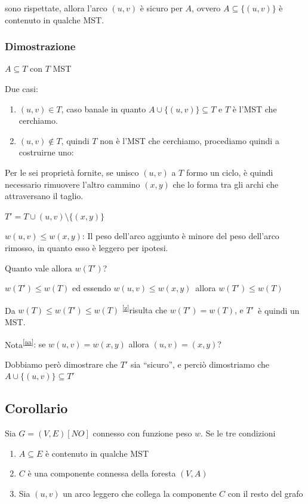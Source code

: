 \documentclass[tikz]{article}
\providecommand{\tightlist}{%
  \setlength{\itemsep}{0pt}\setlength{\parskip}{0pt}}
\begin{document}
{{{sono rispettate, allora l'arco $(u,v)$ è sicuro per $A$, ovvero $A \subseteq \{(u,v)\}$ è contenuto in qualche MST.}

\subsubsection{Dimostrazione}

{$A \subseteq T$ con $T$ MST}

{Due casi:}

\begin{enumerate}
\tightlist
\item
  {$(u,v) \in T$, caso banale in quanto $A \cup \{(u,v)\} \subseteq T$  e $T$ è l'MST che cerchiamo.}
\item
  {$(u,v) \notin T$, quindi $T$ non è l'MST che cerchiamo, procediamo quindi a costruirne uno:}
\end{enumerate}

{Per le sei proprietà fornite, se unisco $(u,v)$ a $T$ formo un ciclo, è quindi necessario rimuovere l'altro cammino $(x,y)$ che lo forma tra gli archi che attraversano il taglio. }

$T' = T \cup {(u,v)} \setminus \{(x,y)\} $



$w(u,v) \leq w(x,y)${: Il peso dell'arco aggiunto è minore del peso dell'arco rimosso, in quanto esso è leggero per ipotesi.}

{Quanto vale allora $w(T')$? }

$w(T') \leq w(T)$ {ed essendo }$w(u,v) \leq w(x,y)${~allora $w(T') \leq w(T)$}

{Da }$w(T) \leq w(T') \leq w(T)$ \textsuperscript{\protect\hyperlink{cmnt26}{{[}z{]}}}{risulta che $w(T') = w(T)$, e }$T'${~è quindi un MST.}

{Nota}\textsuperscript{\protect\hyperlink{cmnt27}{{[}aa{]}}}{: se $w(u,v) = w(x,y)$ allora $(u,v) = (x,y)$?}

{Dobbiamo però dimostrare che $T'$ sia ``sicuro'', e perciò dimostriamo che \\ $A \cup \{(u,v)\} \subseteq T'$}

\subsection{Corollario}

{Sia $G=(V,E) [NO]$ connesso con funzione peso $w$. Se le tre condizioni}

\begin{enumerate}
\tightlist
\item
  {$A \subseteq E$ è contenuto in qualche MST}
\item
  {$C$ è una componente connessa della foresta $(V,A)$}
\item
  {Sia $(u,v)$ un arco leggero che collega la componente $C$ con il resto del grafo}
\end{enumerate}

}}
\end{document}
